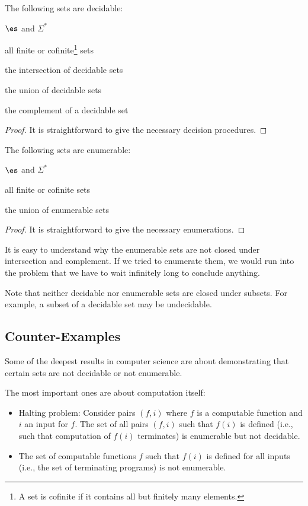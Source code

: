 \begin{theorem}
The following sets are decidable:
\begin{compactitem}
  \item $\es$ and $\Sigma^*$
  \item all finite or cofinite\footnote{A set is cofinite if it contains all but finitely many elements.} sets
  \item the intersection of decidable sets
  \item the union of decidable sets
  \item the complement of a decidable set
\end{compactitem}
\end{theorem}
\begin{proof}
It is straightforward to give the necessary decision procedures.
\end{proof}

\begin{theorem}
The following sets are enumerable:
\begin{compactitem}
  \item $\es$ and $\Sigma^*$
  \item all finite or cofinite sets
  \item the union of enumerable sets
\end{compactitem}
\end{theorem}
\begin{proof}
It is straightforward to give the necessary enumerations.
\end{proof}

It is easy to understand why the enumerable sets are not closed under intersection and complement.
If we tried to enumerate them, we would run into the problem that we have to wait infinitely long to conclude anything.

Note that neither decidable nor enumerable sets are closed under subsets.
For example, a subset of a decidable set may be undecidable.

\subsection{Counter-Examples}

Some of the deepest results in computer science are about demonstrating that certain sets are not decidable or not enumerable.

The most important ones are about computation itself:
\begin{itemize}
\item Halting problem: Consider pairs $(f,i)$ where $f$ is a computable function and $i$ an input for $f$.
The set of all pairs $(f,i)$ such that $f(i)$ is defined (i.e., such that computation of $f(i)$ terminates) is enumerable but not decidable.
\item The set of computable functions $f$ such that $f(i)$ is defined for all inputs (i.e., the set of terminating programs) is not enumerable.
\end{itemize}


